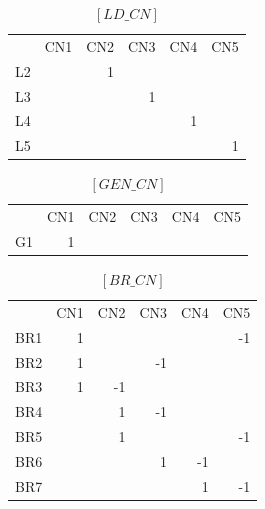 \documentclass[nols,a4paper,twoside,notoc,fleqn]{tufte-book}
\begin{document}
\begin{table}[h!]
	\begin{tabular}{lrrrrr}
		{} &  CN1 &  CN2 &  CN3 &  CN4 &  CN5 \\
		L2 &      &    1 &      &      &      \\
		L3 &      &      &    1 &      &      \\
		L4 &      &      &      &    1 &      \\
		L5 &      &      &      &      &    1 \\
	\end{tabular}
\caption{$[LD\_CN]$}
\end{table}








\begin{table}[h!]
	\begin{tabular}{lrrrrr}
		{} &  CN1 &  CN2 &  CN3 &  CN4 &  CN5 \\
		G1 &    1 &      &      &      &      \\
	\end{tabular}
\caption{$[GEN\_CN]$}
\end{table}




\begin{table}[h!]
	\begin{tabular}{lrrrrr}
		{} &  CN1 &  CN2 &  CN3 &  CN4 &  CN5 \\
		BR1 &    1 &      &      &      &   -1 \\
		BR2 &    1 &      &   -1 &      &      \\
		BR3 &    1 &   -1 &      &      &      \\
		BR4 &      &    1 &   -1 &      &      \\
		BR5 &      &    1 &      &      &   -1 \\
		BR6 &      &      &    1 &   -1 &      \\
		BR7 &      &      &      &    1 &   -1 \\
	\end{tabular}
\caption{$[BR\_CN]$}
\end{table}
\end{document}
